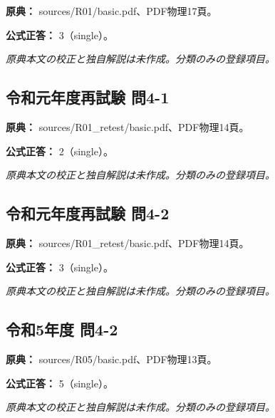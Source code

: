 \noindent\textbf{原典：} sources/R01/basic.pdf、PDF物理17頁。

\textbf{公式正答：} 3（single）。

\par\textit{原典本文の校正と独自解説は未作成。分類のみの登録項目。}

\subsection{令和元年度再試験 問4-1}
\label{q:r01-ret-basic-4-1}

\noindent\textbf{原典：} sources/R01\_retest/basic.pdf、PDF物理14頁。

\textbf{公式正答：} 2（single）。

\par\textit{原典本文の校正と独自解説は未作成。分類のみの登録項目。}

\subsection{令和元年度再試験 問4-2}
\label{q:r01-ret-basic-4-2}

\noindent\textbf{原典：} sources/R01\_retest/basic.pdf、PDF物理14頁。

\textbf{公式正答：} 3（single）。

\par\textit{原典本文の校正と独自解説は未作成。分類のみの登録項目。}

\subsection{令和5年度 問4-2}
\label{q:r05-reg-basic-4-2}

\noindent\textbf{原典：} sources/R05/basic.pdf、PDF物理13頁。

\textbf{公式正答：} 5（single）。

\par\textit{原典本文の校正と独自解説は未作成。分類のみの登録項目。}
